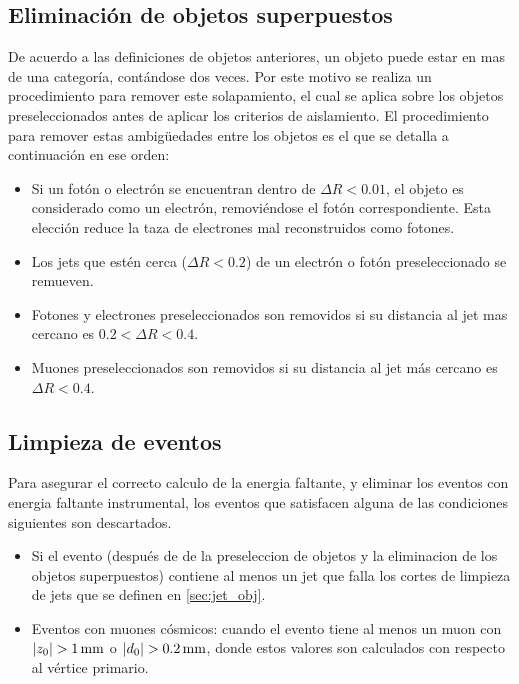 \subsection{Eliminación de objetos superpuestos} %
\label{sec:overlap_romoval_event_veto}

De acuerdo a las definiciones de objetos anteriores, un objeto puede estar en
mas de una categoría, contándose dos veces. Por este motivo se realiza un
procedimiento para remover este solapamiento, el cual se aplica sobre los
objetos preseleccionados antes de aplicar los criterios de aislamiento. El
procedimiento para remover estas ambigüedades entre los objetos es el que se
detalla a continuación en ese orden:

\begin{itemize}\itemsep0.1cm
\item Si un fotón o electrón se encuentran dentro de $\Delta R < 0.01$, el
  objeto es considerado como un electrón, removiéndose el fotón correspondiente.
  Esta elección reduce la taza de electrones mal reconstruidos como fotones.
\item Los jets que estén cerca ($\Delta R<0.2$) de un electrón o fotón
  preseleccionado se remueven.
\item Fotones y electrones preseleccionados son removidos si su distancia al jet
  mas cercano es $0.2 < \Delta R < 0.4$.
\item Muones preseleccionados son removidos si su distancia al jet más cercano
  es $\Delta R < 0.4$.
\end{itemize}


\subsection{Limpieza de eventos}

Para asegurar el correcto calculo de la energia faltante, y eliminar
los eventos con energia faltante instrumental, los eventos que satisfacen
alguna de las condiciones siguientes son descartados.

\begin{itemize}\itemsep0.1cm
\item Si el evento (después de de la preseleccion de objetos y la eliminacion de los objetos superpuestos) contiene al menos
  un jet que falla los cortes de limpieza de jets que se definen en
  \cref{sec:jet_obj}.

\item Eventos con muones cósmicos: cuando el evento tiene al menos un muon con $|z_{0}| > \unit[1]{mm}$ o $|d_0| >
  \unit[0.2]{mm}$, donde estos valores son calculados con respecto al vértice
  primario. %
\end{itemize}

